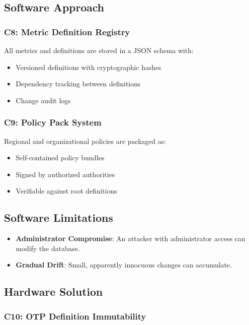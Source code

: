 \documentclass[11pt,a4paper]{article}
\begin{document}
\subsection{Software Approach}

\subsubsection{C8: Metric Definition Registry}

All metrics and definitions are stored in a JSON schema with:
\begin{itemize}
    \item Versioned definitions with cryptographic hashes
    \item Dependency tracking between definitions
    \item Change audit logs
\end{itemize}

\subsubsection{C9: Policy Pack System}

Regional and organizational policies are packaged as:
\begin{itemize}
    \item Self-contained policy bundles
    \item Signed by authorized authorities
    \item Verifiable against root definitions
\end{itemize}

\subsection{Software Limitations}

\begin{itemize}
    \item \textbf{Administrator Compromise}: An attacker with administrator access can modify the database.
    \item \textbf{Gradual Drift}: Small, apparently innocuous changes can accumulate.
\end{itemize}

\subsection{Hardware Solution}

\subsubsection{C10: OTP Definition Immutability}
\end{document}
